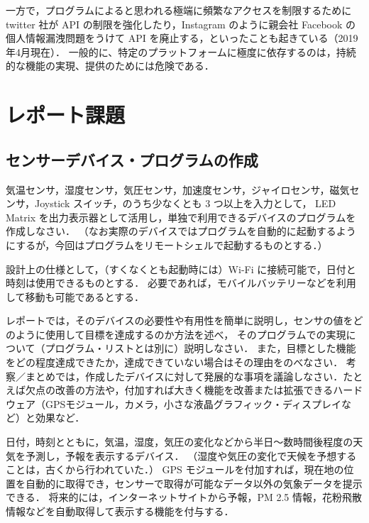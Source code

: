 \documentclass[11pt,a4,epsf]{report}
\begin{document}
一方で，プログラムによると思われる極端に頻繁なアクセスを制限するために twitter 社が API の制限を強化したり，Instagram のように親会社 Facebook の個人情報漏洩問題をうけて API を廃止する，といったことも起きている（2019年4月現在）．
一般的に、特定のプラットフォームに極度に依存するのは，持続的な機能の実現、提供のためには危険である．


\chapter{レポート課題}

\section{センサーデバイス・プログラムの作成}

\begin{subject}
気温センサ，湿度センサ，気圧センサ，加速度センサ，ジャイロセンサ，磁気センサ，Joystick スイッチ，のうち少なくとも 3 つ以上を入力として，
LED Matrix を出力表示器として活用し，単独で利用できるデバイスのプログラムを作成しなさい．
（なお実際のデバイスではプログラムを自動的に起動するようにするが，今回はプログラムをリモートシェルで起動するものとする．）

設計上の仕様として，（すくなくとも起動時には）Wi-Fi に接続可能で，日付と時刻は使用できるものとする．
必要であれば，モバイルバッテリーなどを利用して移動も可能であるとする．

レポートでは，そのデバイスの必要性や有用性を簡単に説明し，センサの値をどのように使用して目標を達成するのか方法を述べ，
そのプログラムでの実現について（プログラム・リストとは別に）説明しなさい．
また，目標とした機能をどの程度達成できたか，達成できていない場合はその理由をのべなさい．
考察／まとめでは，作成したデバイスに対して発展的な事項を議論しなさい．たとえば欠点の改善の方法や，付加すれば大きく機能を改善または拡張できるハードウェア（GPSモジュール，カメラ，小さな液晶グラフィック・ディスプレイなど）と効果など．
\end{subject}

\begin{example}
日付，時刻とともに，気温，湿度，気圧の変化などから半日〜数時間後程度の天気を予測し，予報を表示するデバイス．
（湿度や気圧の変化で天候を予想することは，古くから行われていた．）
GPS モジュールを付加すれば，現在地の位置を自動的に取得でき，センサーで取得が可能なデータ以外の気象データを提示できる．
将来的には，インターネットサイトから予報，PM 2.5 情報，花粉飛散情報などを自動取得して表示する機能を付与する．
\end{example}
\end{document}
